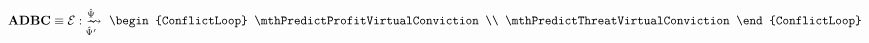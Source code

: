 \begin{equation}
    \text{\abbrADBC} \equiv \mthNeuralQuasiEvidence \mthNeuralQuasiBayesianUpdateConviction{\mthNQSpace}{\mthNQSpace'}
        \vcenter{\hbox{
            \begin{ConflictLoop}
                \mthPredictProfitVirtualConviction \\ 
                \mthPredictThreatVirtualConviction
            \end{ConflictLoop}
        }}
\end{equation}


